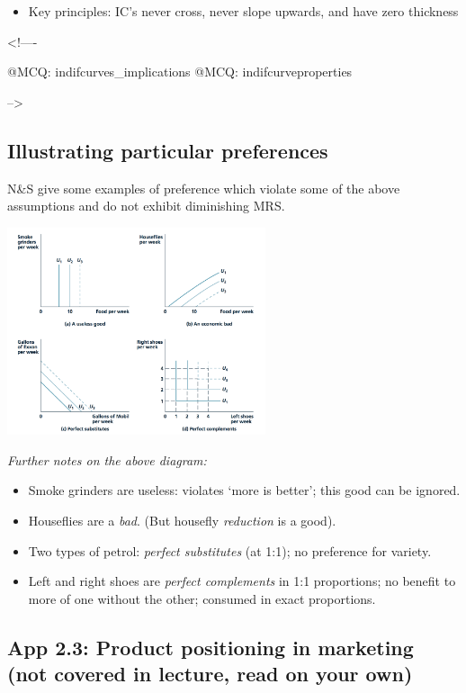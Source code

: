 \documentclass[]{article}
\providecommand{\tightlist}{%
  \setlength{\itemsep}{0pt}\setlength{\parskip}{0pt}}
\begin{document}
\begin{itemize}
\tightlist
\item
  Key principles: IC's never cross, never slope upwards, and have zero
  thickness
\end{itemize}

\textless!----

@MCQ: indifcurves\_implications @MCQ: indifcurveproperties

--\textgreater{}

\hypertarget{illustrating-particular-preferences}{%
\subsection{Illustrating particular
preferences}\label{illustrating-particular-preferences}}

N\&S give some examples of preference which violate some of the above
assumptions and do not exhibit diminishing MRS.

\includegraphics[height=2.4in]{picsfigs/particularpreferences.png}

\bigskip

\emph{Further notes on the above diagram:}

\begin{itemize}
\item
  Smoke grinders are useless: violates `more is better'; this good can
  be ignored.
\item
  Houseflies are a \emph{bad}. (But housefly \emph{reduction} is a
  good).
\item
  Two types of petrol: \emph{perfect substitutes} (at 1:1); no
  preference for variety.
\item
  Left and right shoes are \emph{perfect complements} in 1:1
  proportions; no benefit to more of one without the other; consumed in
  exact proportions.
\end{itemize}

\hypertarget{app-2.3-product-positioning-in-marketing-not-covered-in-lecture-read-on-your-own}{%
\subsection{App 2.3: Product positioning in marketing (not covered in
lecture, read on your
own)}\label{app-2.3-product-positioning-in-marketing-not-covered-in-lecture-read-on-your-own}}
\end{document}
